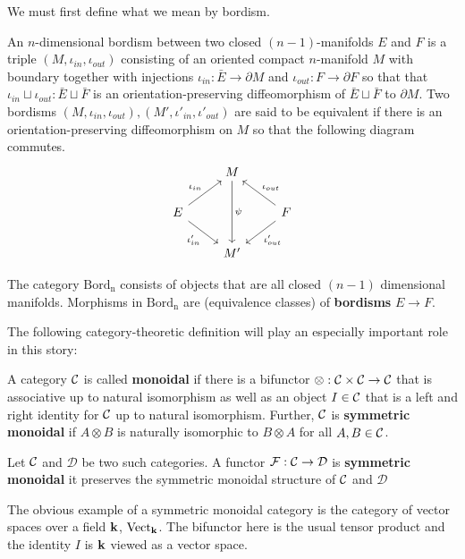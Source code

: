 	We must first define what we mean by bordism.
	\begin{defn}[Bordism]
		An $n$-dimensional bordism between two closed $(n-1)$-manifolds $E$ and $F$ is a triple $(M, \iota_{in},\iota_{out})$ consisting of an oriented compact $n$-manifold $M$ with boundary together with injections $\iota_{in}: \bar E \to \partial M$ and $\iota_{out}: F \to \partial F$ so that that $\iota_{in} \sqcup \iota_{out}: \bar E \sqcup \bar F$ is an orientation-preserving diffeomorphism of $\bar E \sqcup \bar F$ to $\partial M$. Two bordisms $(M, \iota_{in}, \iota_{out}), (M', \iota'_{in}, \iota'_{out})$ are said to be equivalent if there is an orientation-preserving diffeomorphism on $M$ so that the following diagram commutes.
		\[
			\begin{tikzcd}
				& M\arrow[dd,"\psi"] &\\
				E\arrow[ur,"\iota_{in}"]\arrow[dr,swap,"\iota'_{in}"] & & \arrow[ul,swap,"\iota_{out}"]\arrow[dl,"\iota'_{out}"] F\\
				& M' &
			\end{tikzcd}
		\]
	\end{defn}
	\begin{defn}
		The category $\mathrm{Bord_n}$ consists of objects that are all closed $(n-1)$ dimensional manifolds. Morphisms in $\mathrm{Bord_n}$ are (equivalence classes) of \textbf{bordisms} $E \to F$. 
	\end{defn}
	
	The following category-theoretic definition will play an especially important role in this story:
	\begin{defn}
		A category $\mathcal{C}$ is called \textbf{monoidal} if there is a bifunctor $\otimes: \mathcal{C} \times \mathcal{C} \to \mathcal{C}$ that is associative up to natural isomorphism as well as an object $I \in \mathcal{C}$ that is a left and right identity for $\mathcal{C}$ up to natural isomorphism. Further, $\mathcal{C}$ is \textbf{symmetric monoidal} if $A \otimes B$ is naturally isomorphic to $B \otimes A$ for all $A, B \in \mathcal{C}$.
	\end{defn}
	
	\noindent Let $\mathcal{C}$ and $\mathcal D$ be two such categories. A functor $\mathcal F: \mathcal{C} \to \mathcal D$ is \textbf{symmetric monoidal} it preserves the symmetric monoidal structure of $\mathcal{C}$ and $\mathcal D$ 
	
	\begin{eg}
		The obvious example of a symmetric monoidal category is the category of vector spaces over a field $\mathbf{k}$, $\mathrm{Vect}_{\mathbf{k}}$. The bifunctor here is the usual tensor product and the identity $I$ is $\mathbf{k}$ viewed as a vector space. 
	\end{eg}
	
